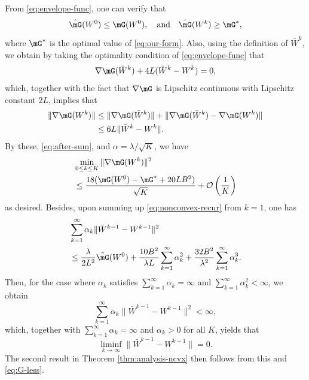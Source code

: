 From \eqref{eq:envelope-func}, one can verify that
$$ \hat{\mG}(W^0) \leq \mG(W^0), \quad \mbox{and} \quad \hat{\mG}(W^k) \geq \mG^*, $$
where $\mG^*$ is the optimal value of \eqref{eq:our-form}. Also, using the definition of $\bar{W}^k$, we obtain by taking the optimality condition of \eqref{eq:envelope-func} that
$$ \nabla \mG(\bar{W}^k) + 4L(\bar{W}^k - W^k) = 0, $$
which, together with the fact that $\nabla \mG$ is Lipschitz continuous with Lipschitz constant $2L$, implies that
\begin{equation}\label{eq:G-less}
\begin{aligned}
\|\nabla \mG(W^k)\| & \leq \|\nabla \mG(\bar{W}^k)\| + \|\nabla \mG(\bar{W}^k) - \nabla\mG(W^k)\| \\
& \leq 6L\|\bar{W}^k - W^k\|. 
\end{aligned}
\end{equation}
By these, \eqref{eq:after-sum}, and $\alpha = \lambda/\sqrt{K}$, we have
$$ 
\begin{aligned}
& \min_{0\leq k\leq K}\|\nabla \mG(W^k)\|^2 \\
& \leq \frac{18(\mG(W^0) - \mG^* + 20LB^2)}{\sqrt{K}} + \mathcal{O}\left(\frac{1}{K}\right)
\end{aligned}
$$
as desired. Besides, upon summing up \eqref{eq:nonconvex-recur} from $k=1$, one has
\begin{align*}
& \sum_{k=1}^\infty\alpha_k\|\bar{W}^{k-1} - W^{k-1}\|^2 \\
& \leq \frac{\lambda}{2L^2}\hat{\mG}(W^0) + \frac{10B^2}{\lambda L}\sum_{k=1}^\infty\alpha_k^2 + \frac{32B^2}{\lambda^2}\sum_{k=1}^\infty\alpha_k^3.
\end{align*}
Then, for the case where $\alpha_k$ satisfies $\sum_{k=1}^\infty\alpha_k = \infty$ and $\sum_{k=1}^\infty\alpha_k^2 < \infty$, we obtain
$$ \sum_{k=1}^\infty\alpha_k\|\bar{W}^{k-1} - W^{k-1}\|^2 < \infty, $$
which, together with $\sum_{k=1}^\infty\alpha_k = \infty$ and $\alpha_k>0$ for all $K$, yields that
$$ \liminf_{k\rightarrow\infty}\|\bar{W}^{k-1} - W^{k-1}\| = 0. $$
The second result in Theorem \ref{thm:analysis-ncvx} then follows from this and \eqref{eq:G-less}.


